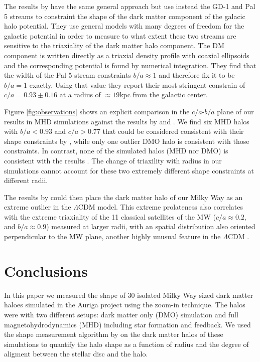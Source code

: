 \documentclass[usenatbib]{mnras}
\begin{document}
The results by \cite{Bovy16} have the same general approach but use
instead the GD-1 \citep{2006ApJ...641L..37G} and Pal 5 \citep{2009AJ....137.3378O}
streams to constraint the shape of the dark matter component of the
galacic halo potential.
They use general models with many degrees of freedom for the galactic
potential in order to measure to what extent these two streams are sensitive
to the triaxiality of the dark matter halo component.
The DM component is written directly as a triaxial density profile
with coaxial ellipsoids and the corresponding potential is found by
numerical integration.
They find that the width of the Pal 5 stream constraints $b/a\approx
1$ and therefore fix it to be $b/a=1$ exactly.
Using that value they report their most stringent constrain of
$c/a=0.93\pm0.16$ at a radius of $\approx 19$kpc from the galactic
center. 

Figure \ref{fig:observations} shows an explicit comparison in
the $c/a$-$b/a$ plane of our results in MHD simulations against the
results by \cite{LM10} and \cite{Bovy16}.
We find six MHD halos with $b/a<0.93$ and $c/a>0.77$ that could be
considered consistent with their shape constraints  by \cite{Bovy16}, while
only one outlier DMO halo is consistent with those constraints.
In contrast, none of the simulated halos (MHD nor DMO) is consistent
with the results \cite{LM10}. 
The change of triaxility with radius in our simulations cannot account
for these two extremely different shape constraints at different
radii. 


The results by \label{LM10} could then place the dark matter halo of our Milky
Way as an extreme outlier in the $\Lambda$CDM model. 
This extreme prolateness also correlates with the extreme triaxiality
of the 11 classical satellites of the MW ($c/a\approx 0.2$, and
$b/a\approx0.9$) measured at larger radii, with an spatial
distribution  also oriented perpendicular to the MW plane, another
highly unusual feature in the $\Lambda$CDM \citep{2018MNRAS.478.5533F}. 



\section{Conclusions}
\label{sec:conclusions}

In this paper we measured the shape of 30 isolated Milky Way sized
dark matter haloes simulated in the Auriga project using the zoom-in
technique. 
The halos were with two different setups:
dark matter only (DMO) simulation and full magnetohydrodynamics (MHD)
including star formation and feedback.
We used the shape measurement algorithm by \cite{Allgood06} on the
dark matter halos of these simulations to quantify the halo shape as a
function of radius and the degree of aligment between the stellar disc
and the halo. 
\end{document}
